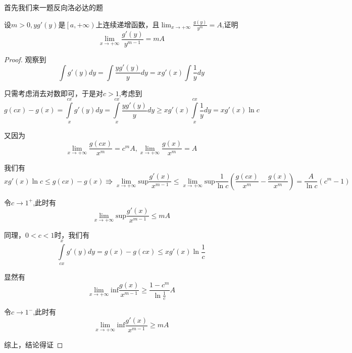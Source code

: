 \documentclass[lang=cn,10pt]{elegantbook}
\begin{document}
	首先我们来一题反向洛必达的题
	\begin{example}
		$\text{设}m>0,yg'\left( y \right) \text{是}\left[ a,+\infty \right) \text{上连续递增函数，且}\lim_{x\rightarrow +\infty} \frac{g\left( y \right)}{y^m}=A$,证明
		\begin{equation*}
			\lim_{x\rightarrow +\infty} \frac{g'\left( y \right)}{y^{m-1}}=mA
		\end{equation*}
	\end{example}
	\begin{proof}
		观察到
		\begin{equation*}
			\int{g'\left( y \right) dy}=\int{\frac{yg'\left( y \right)}{y}dy}=xg'\left( x \right) \int{\frac{1}{y}dy}
		\end{equation*}
		
		只需考虑消去对数即可，于是对$c>1$,考虑到
		\begin{equation*}
			g\left( cx \right) -g\left( x \right) =\int\limits_x^{cx}{g'\left( y \right) dy}=\int\limits_x^{cx}{\frac{yg'\left( y \right)}{y}dy}\ge xg'\left( x \right) \int\limits_x^{cx}{\frac{1}{y}dy}=xg'\left( x \right) \ln c			
		\end{equation*}
		
		又因为
		\begin{equation*}
			\lim_{x\rightarrow +\infty} \frac{g\left( cx \right)}{x^m}=c^mA,\lim_{x\rightarrow +\infty} \frac{g\left( x \right)}{x^m}=A
		\end{equation*}
		
		我们有
		\begin{equation*}
			xg'\left( x \right) \ln c\le g\left( cx \right) -g\left( x \right) \Rrightarrow \lim_{x\rightarrow +\infty} \mathrm{sup}\frac{g'\left( x \right)}{x^{m-1}}\le \lim_{x\rightarrow +\infty} \mathrm{sup}\frac{1}{\ln c}\left( \frac{g\left( cx \right)}{x^m}-\frac{g\left( x \right)}{x^m} \right) =\frac{A}{\ln c}\left( c^m-1 \right) 
		\end{equation*}
		
		令$c\rightarrow 1^{+}$,此时有
		\begin{equation*}
			\lim_{x\rightarrow +\infty} \mathrm{sup}\frac{g'\left( x \right)}{x^{m-1}}\le mA
		\end{equation*}
		
		同理，$0<c<1$时，我们有
		\begin{equation*}
			\int\limits_{cx}^x{g\prime\left( y \right) dy}=g\left( x \right) -g\left( cx \right) \le xg\prime\left( x \right) \ln \frac{1}{c}
		\end{equation*}
		
		显然有
		\begin{equation*}
			\lim_{x\rightarrow +\infty} \mathrm{inf}\frac{g\left( x \right)}{x^{m-1}}\ge \frac{1-c^m}{\ln \frac{1}{c}}A
		\end{equation*}
		
		令$c\rightarrow 1^{-}$,此时有
		\begin{equation*}
			\lim_{x\rightarrow +\infty} \mathrm{inf}\frac{g'\left( x \right)}{x^{m-1}}\ge mA
		\end{equation*}
		
		综上，结论得证
	\end{proof}
	
\end{document}
